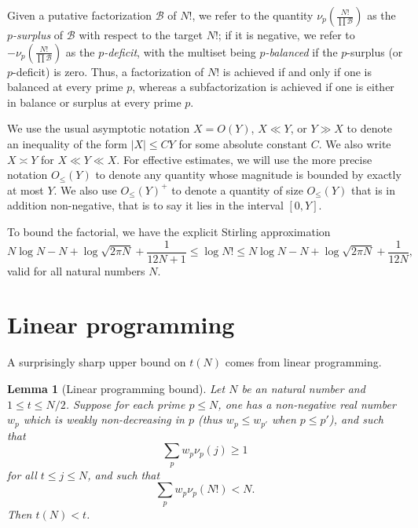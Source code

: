 \documentclass[12pt,a4paper,reqno]{amsart}
\numberwithin{equation}{section}
\theoremstyle{plain}
\newtheorem{lemma}[theorem]{Lemma}
\theoremstyle{definition}
\newcommand\tuple{{\mathcal B}}
\begin{document}
Given a putative factorization $\tuple$ of $N!$,  
we refer to the quantity $\nu_p\left( \frac{N!}{\prod \tuple} \right)$ as the \emph{$p$-surplus} of $\tuple$ with respect to the target $N!$; if it is negative, we refer to $-\nu_p\left( \frac{N!}{\prod \tuple} \right)$ as the \emph{$p$-deficit}, with the multiset being \emph{$p$-balanced} if the $p$-surplus (or $p$-deficit) is zero.  Thus, a factorization of $N!$ is achieved if and only if one is balanced at every prime $p$, whereas a subfactorization is achieved if one is either in balance or surplus at every prime $p$.

We use the usual asymptotic notation $X = O(Y)$, $X \ll Y$, or $Y \gg X$ to denote an inequality of the form $|X| \leq CY$ for some absolute constant $C$.  We also write $X \asymp Y$ for $X \ll Y \ll X$. For effective estimates, we will use the more precise notation $O_{\leq}(Y)$ to denote any quantity whose magnitude is bounded by exactly at most $Y$. We also use $O_{\leq}(Y)^+$ to denote a quantity of size $O_{\leq}(Y)$ that is in addition non-negative, that is to say it lies in the interval $[0,Y]$.

To bound the factorial, we have the explicit Stirling approximation \cite{robbins}
\begin{equation}\label{stirling}
  N \log N - N + \log \sqrt{2\pi N} + \frac{1}{12N+1} \leq \log N! \leq N \log N - N + \log \sqrt{2\pi N} + \frac{1}{12N},
\end{equation}
valid for all natural numbers $N$. 


\section{Linear programming}\label{linprog-sec}

A surprisingly sharp upper bound on $t(N)$ comes from linear programming.

\begin{lemma}[Linear programming bound]\label{lp-upper}  Let $N$ be an natural number and $1 \leq t \leq N/2$.  Suppose for each prime $p \leq N$, one has a non-negative real number $w_p$ which is weakly non-decreasing in $p$ (thus $w_p \leq w_{p'}$ when $p \leq p'$), and such that
  \begin{equation}\label{pj}
   \sum_p w_p \nu_p(j) \geq 1
  \end{equation}
  for all $t \leq j \leq N$, and such that
  \begin{equation}\label{hyp}
  \sum_p w_p \nu_p(N!) < N.
  \end{equation}
  Then $t(N) < t$.
  \end{lemma}
  
\end{document}
